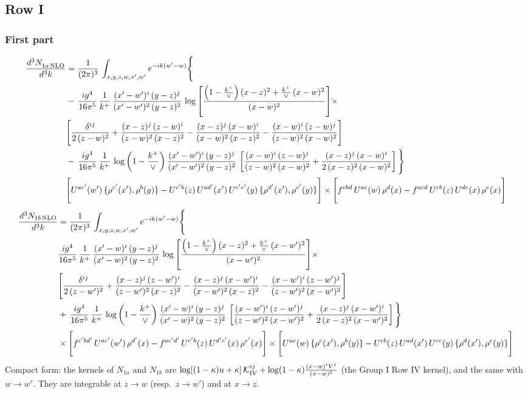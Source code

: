\documentclass[9pt]{article}
\numberwithin{equation}{section}
\begin{document}
\subsection{Row I}
\subsubsection{First part}
\begin{align}
 \frac{d^{3}N_{1a\,\rm NLO}^{\rm}}{d^{3}k}  & =     \frac{1}{(2\pi)^{3}}\,\int_{x,y,z,w,x',w^{\prime}} e^{-ik(w^{\prime}-w)}\Bigg\{\notag \\
& -\, \frac{ig^{4}}{16\pi^{5}}\,\frac{1}{k^{+}}\, \frac{(x'-w')^{i}\,(y-z)^{j}}{(x'-w')^{2}\,(y-z)^{2}}\,\log{\left[\frac{\left(1-\frac{k^{+}}{\vee}\right)(x-z)^{2}+\frac{k^{+}}{\vee}\,(x-w)^{2}}{(x-w)^{2}}\right]}\times\notag \\ &  \Bigg[\frac{\delta^{ij}}{2\,(z-w)^{2}}+\frac{(x-z)^{j}\,(z-w)^{i}}{(z-w)^{2}\,(x-z)^{2}}-\frac{(x-z)^{j}\,(x-w)^{i}}{(x-w)^{2}\,(x-z)^{2}}-\frac{(x-w)^{i}\,(z-w)^{j}}{(z-w)^{2}\,(x-w)^{2}}\Bigg] \notag \\
& -\, \frac{ig^{4}}{16\pi^{5}}\,\frac{1}{k^{+}}\,\log{\left(1-\frac{k^{+}}{\vee}\right)}\,\frac{(x'-w')^{i}\,(y-z)^{j}}{(x'-w')^{2}\,(y-z)^{2}}\,\left[\frac{(x-w)^{i}\,(z-w)^{j}}{(z-w)^{2}\,(x-w)^{2}}+\frac{(x-z)^{j}\,(x-w)^{i}}{2\,(x-z)^{2}\, (x-w)^{2}}\right]\Bigg\} \notag \\ & \Bigg[U^{ac'}(w')\,\{\rho^{c'}(x'),\rho^{b}(y)\}-U^{c'b}(z)\,U^{ad'}(x')\,U^{c'e'}(y)\, \{\rho^{d'}(x'),\rho^{e'}(y)\}\Bigg]\times \Bigg[f^{cbd}\,U^{ac}(w)\,\rho^{d}(x)-f^{acd}\, U^{cb}(z)\,U^{de}(x)\,\rho^{e}(x)\Bigg]
\end{align}
\begin{align}
\frac{d^{3}N_{1b\, \rm NLO}}{d^{3}k} & =  \frac{1}{(2\pi)^{3}}\,\int_{x,y,z,w,x',w^{\prime}} e^{-ik(w^{\prime}-w)}\Bigg\{\notag \\
&  \frac{ig^{4}}{16\pi^{5}}\,\frac{1}{k^{+}}\, \frac{(x'-w)^{i}\,(y-z)^{j}}{(x'-w)^{2}\,(y-z)^{2}}\,\log{\left[\frac{\left(1-\frac{k^{+}}{\vee}\right)(x-z)^{2}+\frac{k^{+}}{\vee}\,(x-w')^{2}}{(x-w')^{2}}\right]}\times\notag \\ &  \Bigg[\frac{\delta^{ij}}{2\,(z-w')^{2}}+\frac{(x-z)^{j}\,(z-w')^{i}}{(z-w')^{2}\,(x-z)^{2}}-\frac{(x-z)^{j}\,(x-w')^{i}}{(x-w')^{2}\,(x-z)^{2}}-\frac{(x-w')^{i}\,(z-w')^{j}}{(z-w')^{2}\,(x-w')^{2}}\Bigg] \notag \\
& +\,\frac{ig^{4}}{16\pi^{5}}\,\frac{1}{k^{+}}\,\log{\left(1-\frac{k^{+}}{\vee}\right)}\,\frac{(x'-w)^{i}\,(y-z)^{j}}{(x'-w)^{2}\,(y-z)^{2}}\,\left[\frac{(x-w')^{i}\,(z-w')^{j}}{(z-w')^{2}\,(x-w')^{2}}+\frac{(x-z)^{j}\,(x-w')^{i}}{2\,(x-z)^{2}\, (x-w')^{2}}\right]\Bigg\} \notag \\ & \times\Bigg[f^{c'bd'}\,U^{ac'}(w')\,\rho^{d'}(x)-f^{ac'd'}\, U^{c'b}(z)\,U^{d'e'}(x)\,\rho^{e'}(x)\Bigg] \times \Bigg[U^{ac}(w)\,\{\rho^{c}(x'),\rho^{b}(y)\}-U^{cb}(z)\,U^{ad}(x')\,U^{ce}(y)\, \{\rho^{d}(x'),\rho^{e}(y)\}\Bigg]
\end{align}
{\color{red}Compact form: the kernels of $N_{1a}$ and $N_{1b}$ are $\log[(1-\kappa)u+\kappa]\,\mathcal K^{ij}_{\rm IV}+\log(1-\kappa)\frac{(x-w)^{i}V^{j}}{(x-w)^{2}}$ (the Group I Row IV kernel), and the same with $w\to w'$. They are integrable at $z\to w$ (resp.\ $z\to w'$) and at $x\to z$.}
\end{document}

